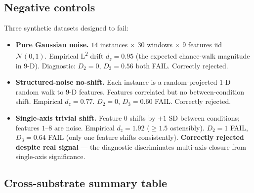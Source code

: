 \documentclass[11pt,a4paper]{article}
\begin{document}
\subsection{Negative controls}\label{sec:results-negative}

Three synthetic datasets designed to fail:
\begin{itemize}\itemsep0pt
\item \textbf{Pure Gaussian noise.} $14$ instances $\times$ $30$ windows $\times$ $9$ features iid $\mathcal{N}(0,1)$. Empirical L\textsuperscript{2} drift $d_z = 0.95$ (the expected chance-walk magnitude in $9$-D). Diagnostic: $D_2 = 0$, $D_3 = 0.56$ both FAIL. Correctly rejected.
\item \textbf{Structured-noise no-shift.} Each instance is a random-projected $1$-D random walk to $9$-D features. Features correlated but no between-condition shift. Empirical $d_z = 0.77$. $D_2 = 0$, $D_3 = 0.60$ FAIL. Correctly rejected.
\item \textbf{Single-axis trivial shift.} Feature $0$ shifts by $+1$ SD between conditions; features $1$--$8$ are noise. Empirical $d_z = 1.92$ ($\geq 1.5$ ostensibly). $D_2 = 1$ FAIL, $D_3 = 0.64$ FAIL (only one feature shifts consistently). \textbf{Correctly rejected despite real signal} --- the diagnostic discriminates multi-axis closure from single-axis significance.
\end{itemize}

\subsection{Cross-substrate summary table}\label{sec:results-summary}
\end{document}
